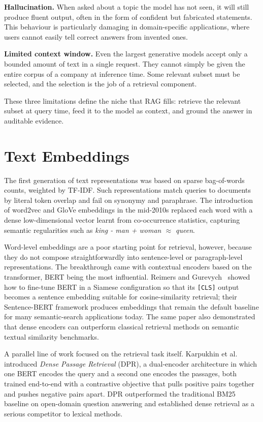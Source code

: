 \textbf{Hallucination.} When asked about a topic the model has not seen, it
will still produce fluent output, often in the form of confident but
fabricated statements. This behaviour is particularly damaging in
domain-specific applications, where users cannot easily tell correct answers
from invented ones.

\textbf{Limited context window.} Even the largest generative models accept
only a bounded amount of text in a single request. They cannot simply be
given the entire corpus of a company at inference time. Some relevant subset
must be selected, and the selection is the job of a retrieval component.

These three limitations define the niche that RAG fills: retrieve the
relevant subset at query time, feed it to the model as context, and ground
the answer in auditable evidence.

\section{Text Embeddings}
\label{sec:embeddings}

The first generation of text representations was based on sparse
bag-of-words counts, weighted by TF-IDF. Such representations match queries
to documents by literal token overlap and fail on synonymy and paraphrase.
The introduction of word2vec and GloVe embeddings in the mid-2010s replaced
each word with a dense low-dimensional vector learnt from co-occurrence
statistics, capturing semantic regularities such as \emph{king - man +
woman $\approx$ queen}.

Word-level embeddings are a poor starting point for retrieval, however,
because they do not compose straightforwardly into sentence-level or
paragraph-level representations. The breakthrough came with contextual
encoders based on the transformer, BERT being the most influential. Reimers
and Gurevych~\cite{Reimers2019SentenceBERT} showed how to fine-tune BERT in a
Siamese configuration so that its \texttt{[CLS]} output becomes a sentence
embedding suitable for cosine-similarity retrieval; their Sentence-BERT
framework produces embeddings that remain the default baseline for many
semantic-search applications today. The same paper also demonstrated that
dense encoders can outperform classical retrieval methods on semantic
textual similarity benchmarks.

A parallel line of work focused on the retrieval task itself. Karpukhin et
al.~\cite{Karpukhin2020DPR} introduced \emph{Dense Passage Retrieval} (DPR),
a dual-encoder architecture in which one BERT encodes the query and a second
one encodes the passages, both trained end-to-end with a contrastive
objective that pulls positive pairs together and pushes negative pairs
apart. DPR outperformed the traditional BM25 baseline on open-domain
question answering and established dense retrieval as a serious competitor
to lexical methods.

